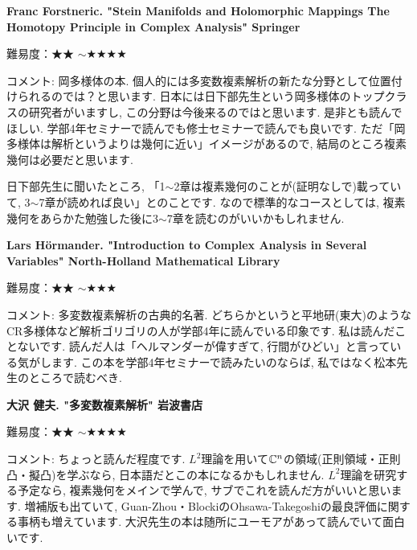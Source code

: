 \textbf{Franc Forstneric. "Stein Manifolds and Holomorphic Mappings
The Homotopy Principle in Complex Analysis" Springer}   \vspace{-6pt} 

難易度：★★ $\sim$★★★★ \vspace{-6pt} 

コメント: 岡多様体の本. 個人的には多変数複素解析の新たな分野として位置付けられるのでは？と思います. 日本には日下部先生という岡多様体のトップクラスの研究者がいますし, この分野は今後来るのではと思います. 
是非とも読んでほしい. 学部4年セミナーで読んでも修士セミナーで読んでも良いです.  ただ「岡多様体は解析というよりは幾何に近い」イメージがあるので, 結局のところ複素幾何は必要だと思います.

日下部先生に聞いたところ, 「1$\sim$2章は複素幾何のことが(証明なしで)載っていて, 3$\sim$7章が読めれば良い」とのことです. なので標準的なコースとしては, 複素幾何をあらかた勉強した後に3$\sim$7章を読むのがいいかもしれません. 
\vspace{8pt}

\textbf{Lars Hörmander. "Introduction to Complex Analysis in Several Variables" North-Holland Mathematical Library}   \vspace{-6pt} 

難易度：★★ $\sim$★★★ \vspace{-6pt} 

コメント: 多変数複素解析の古典的名著. どちらかというと平地研(東大)のようなCR多様体など解析ゴリゴリの人が学部4年に読んでいる印象です. 私は読んだことないです. 読んだ人は「ヘルマンダーが偉すぎて, 行間がひどい」と言っている気がします. 
この本を学部4年セミナーで読みたいのならば, 私ではなく松本先生のところで読むべき. 
\vspace{8pt}

\textbf{大沢 健夫. "多変数複素解析" 岩波書店}  　\vspace{-6pt} 

難易度：★★ $\sim$★★★★ 　\vspace{-6pt} 

コメント: ちょっと読んだ程度です. $L^2$理論を用いて$\mathbb{C}^n$の領域(正則領域・正則凸・擬凸)を学ぶなら, 日本語だとこの本になるかもしれません. 
$L^2$理論を研究する予定なら, 複素幾何をメインで学んで, サブでこれを読んだ方がいいと思います. 
増補版も出ていて, Guan-Zhou・BlockiのOhsawa-Takegoshiの最良評価に関する事柄も増えています. 
大沢先生の本は随所にユーモアがあって読んでいて面白いです. 
\vspace{8pt}

